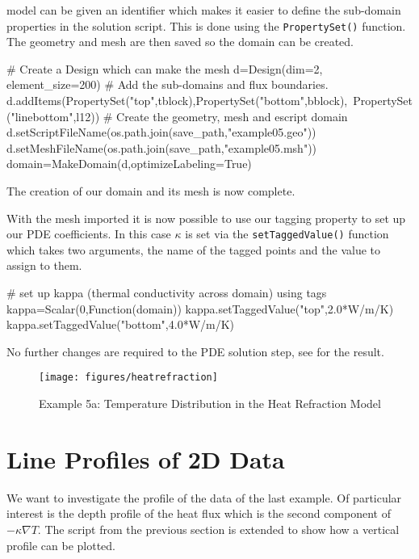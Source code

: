 model can be given an identifier which makes it easier to define the sub-domain
properties in the solution script. This is done using the 
\verb|PropertySet()| function. The geometry and mesh are then saved so the
\esc domain can be created.
\begin{python}
# Create a Design which can make the mesh
d=Design(dim=2, element_size=200)
# Add the sub-domains and flux boundaries.
d.addItems(PropertySet("top",tblock),PropertySet("bottom",bblock),\
                   PropertySet("linebottom",l12))
# Create the geometry, mesh and escript domain
d.setScriptFileName(os.path.join(save_path,"example05.geo"))
d.setMeshFileName(os.path.join(save_path,"example05.msh"))
domain=MakeDomain(d,optimizeLabeling=True)
\end{python}
The creation of our domain and its mesh is now complete.

With the mesh imported it is now possible to use our tagging property to set up
our PDE coefficients. In this case $\kappa$ is set via the
\verb|setTaggedValue()| function which takes two arguments, the name of the
tagged points and the value to assign to them. 
\begin{python}
# set up kappa (thermal conductivity across domain) using tags
kappa=Scalar(0,Function(domain))
kappa.setTaggedValue("top",2.0*W/m/K)
kappa.setTaggedValue("bottom",4.0*W/m/K)
\end{python}
No further changes are required to the PDE solution step, see
 for the result. 

\begin{figure}[ht]
\centerline{\texttt{[image: figures/heatrefraction]}}
\caption{Example 5a: Temperature Distribution in the Heat Refraction Model}
\label{fig:anticlinetemp}
\end{figure}
\clearpage

\section{Line Profiles of 2D Data}
We want to investigate the profile of the data of the last example. 
Of particular interest is the depth profile of the heat flux which is the
second component of $-\kappa \nabla T$. The script from the previous section
is extended to show how a vertical profile can be plotted.

